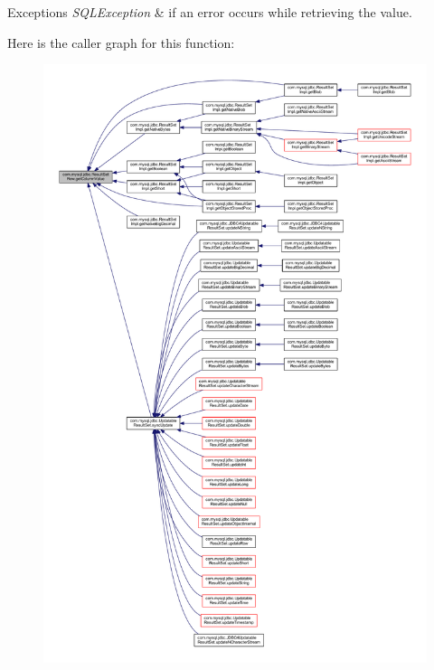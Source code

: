 \begin{DoxyExceptions}{Exceptions}
{\em S\+Q\+L\+Exception} & if an error occurs while retrieving the value. \\
\hline
\end{DoxyExceptions}
Here is the caller graph for this function\+:
\nopagebreak
\begin{figure}[H]
\begin{center}
\leavevmode
\includegraphics[width=350pt]{classcom_1_1mysql_1_1jdbc_1_1_result_set_row_a5213f1db94bbf4bbd98c5141aff51fb8_icgraph}
\end{center}
\end{figure}
\mbox{\label{classcom_1_1mysql_1_1jdbc_1_1_result_set_row_a293e31748cc32630b98c119b1a87c9ee}} 
